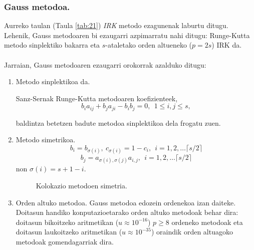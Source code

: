 \subsubsection*{Gauss metodoa.}

Aurreko taulan (Taula \ref{tab:21}) \emph{IRK} metodo ezagunenak laburtu ditugu. Lehenik, Gauss metodoaren bi ezaugarri azpimarratu nahi ditugu:  Runge-Kutta metodo sinplektiko bakarra eta $s$-ataletako orden altueneko ($p=2s$) IRK da. 

\paragraph*{}Jarraian, Gauss metodoaren ezaugarri orokorrak azalduko ditugu:  
\begin{enumerate}
\item{Metodo sinplektikoa da.}

Sanz-Sernak  \cite{JMSanz-Serna1994}  Runge-Kutta metodoaren koefizienteek,  
\begin{equation} \label{eq:1}
b_{i}a_{ij}+b_{j}a_{ji}-b_{i}b_{j}=0, \ \ 1 \leqslant i,j \leqslant s,
\end{equation}

baldintza betetzen badute metodoa sinplektikoa dela frogatu zuen.  
 
\item{Metodo simetrikoa}.
 \begin{equation} \label {eq:2}
 b_{i} = b_{\sigma(i)} ,\  c_{\sigma(i)}= 1-c_{i}, \ \  i=1,2,\dots \lceil s/2\rceil
 \end{equation} 
  \begin{equation} \label{eq:3}
 b_{j}= a_{\sigma(i),\sigma(j)}a_{i,j}, \ \  i=1,2,\dots \lceil s/2\rceil
 \end{equation} 
non $\sigma(i)=s+1-i$.
 
 \begin{figure}[h]
 \centering
 \caption{ \small Kolokazio metodoen simetria.}
 \label{fig:pendulua}
 \end{figure}
 
\item{Orden altuko metodoa.}
Gauss metodoa  edozein ordenekoa izan daiteke. Doitasun handiko konputazioetarako orden altuko metodoak behar dira: doitasun bikoitzeko aritmetikan ($u\approx10^{-16}$) $p\ge8$ ordeneko metodoak eta doitasun laukoitzeko aritmetikan ($u\approx10^{-35}$)  oraindik orden altuagoko metodoak gomendagarriak dira.  


\end{enumerate}
